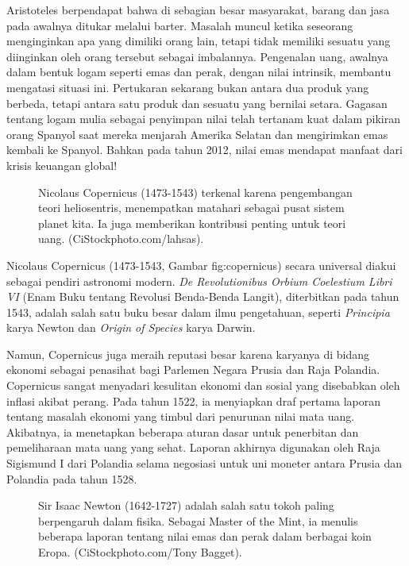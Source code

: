 \documentclass[a4paper,12pt]{book}
\begin{document}
Aristoteles berpendapat bahwa di sebagian besar masyarakat, barang dan jasa pada awalnya ditukar melalui barter. Masalah muncul ketika seseorang menginginkan apa yang dimiliki orang lain, tetapi tidak memiliki sesuatu yang diinginkan oleh orang tersebut sebagai imbalannya. Pengenalan uang, awalnya dalam bentuk logam seperti emas dan perak, dengan nilai intrinsik, membantu mengatasi situasi ini. Pertukaran sekarang bukan antara dua produk yang berbeda, tetapi antara satu produk dan sesuatu yang bernilai setara. Gagasan tentang logam mulia sebagai penyimpan nilai telah tertanam kuat dalam pikiran orang Spanyol saat mereka menjarah Amerika Selatan dan mengirimkan emas kembali ke Spanyol. Bahkan pada tahun 2012, nilai emas mendapat manfaat dari krisis keuangan global!

\begin{figure}[h]
\centering
\caption{Nicolaus Copernicus (1473-1543) terkenal karena pengembangan teori heliosentris, menempatkan matahari sebagai pusat sistem planet kita. Ia juga memberikan kontribusi penting untuk teori uang. (CiStockphoto.com/lahsas).}
\label{fig:copernicus}
\end{figure}

Nicolaus Copernicus (1473-1543, Gambar  {fig:copernicus}) secara universal diakui sebagai pendiri astronomi modern. \textit{De Revolutionibus Orbium Coelestium Libri VI} (Enam Buku tentang Revolusi Benda-Benda Langit), diterbitkan pada tahun 1543, adalah salah satu buku besar dalam ilmu pengetahuan, seperti \textit{Principia} karya Newton dan \textit{Origin of Species} karya Darwin.

Namun, Copernicus juga meraih reputasi besar karena karyanya di bidang ekonomi sebagai penasihat bagi Parlemen Negara Prusia dan Raja Polandia. Copernicus sangat menyadari kesulitan ekonomi dan sosial yang disebabkan oleh inflasi akibat perang. Pada tahun 1522, ia menyiapkan draf pertama laporan tentang masalah ekonomi yang timbul dari penurunan nilai mata uang. Akibatnya, ia menetapkan beberapa aturan dasar untuk penerbitan dan pemeliharaan mata uang yang sehat. Laporan akhirnya digunakan oleh Raja Sigismund I dari Polandia selama negosiasi untuk uni moneter antara Prusia dan Polandia pada tahun 1528.

\begin{figure}[h]
\centering
\caption{Sir Isaac Newton (1642-1727) adalah salah satu tokoh paling berpengaruh dalam fisika. Sebagai Master of the Mint, ia menulis beberapa laporan tentang nilai emas dan perak dalam berbagai koin Eropa. (CiStockphoto.com/Tony Bagget).}
\label{fig:newton}
\end{figure}
\end{document}
